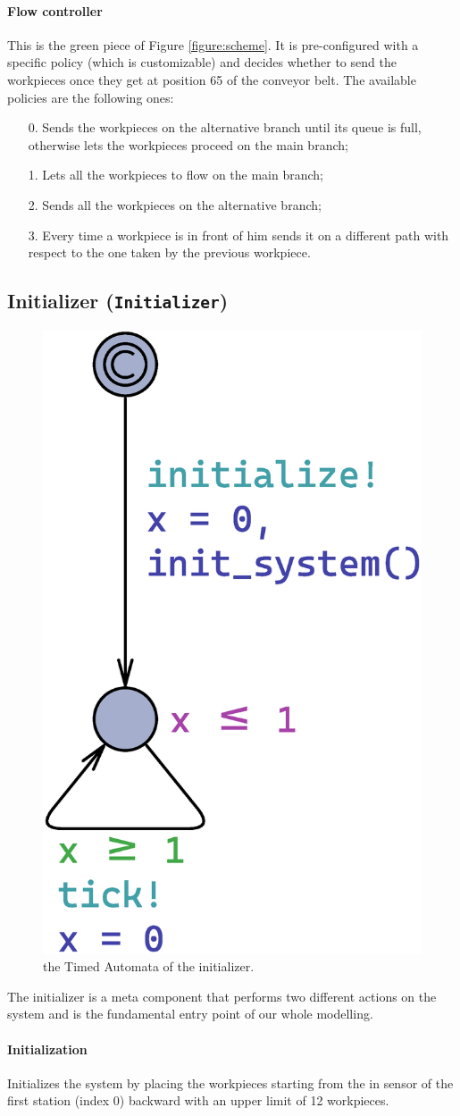 \documentclass[a4paper]{article}
\newcommand{\figureref}[1]{Figure \ref{#1}}
\begin{document}
    \paragraph{Flow controller} This is the green piece of \figureref{figure:scheme}. It is pre-configured with a specific policy (which is customizable) and decides whether to send the workpieces once they get at position 65 of the conveyor belt. The available policies are the following ones:
    \begin{enumerate}
        \item[0.] Sends the workpieces on the alternative branch until its queue is full, otherwise lets the workpieces proceed on the main branch;
        \item[1.] Lets all the workpieces to flow on the main branch;
        \item[2.] Sends all the workpieces on the alternative branch;
        \item[3.] Every time a workpiece is in front of him sends it on a different path with respect to the one taken by the previous workpiece.
    \end{enumerate}

    \subsection{Initializer (\texttt{Initializer})}

    \begin{figure}[h!]
        \centering
        \includegraphics[width=0.12\columnwidth]{./images/automata/initializer}
        \caption{the Timed Automata of the initializer.}
    \end{figure}

    The initializer is a meta component that performs two different actions on the system and is the fundamental entry point of our whole modelling.

    \paragraph{Initialization} Initializes the system by placing the workpieces starting from the in sensor of the first station (index 0) backward with an upper limit of 12 workpieces.
\end{document}
